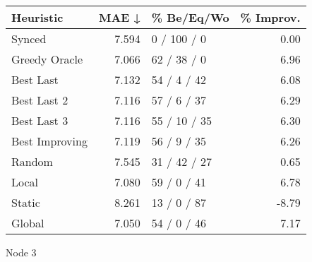 \begin{tabular}{lrlr}
\toprule
\textbf{Heuristic} & \textbf{MAE ↓} & \textbf{\% Be/Eq/Wo} & \textbf{\% Improv.} \\
\midrule
            Synced &          7.594 &          0 / 100 / 0 &                0.00 \\
     Greedy Oracle &          7.066 &          62 / 38 / 0 &                6.96 \\
         Best Last &          7.132 &          54 / 4 / 42 &                6.08 \\
       Best Last 2 &          7.116 &          57 / 6 / 37 &                6.29 \\
       Best Last 3 &          7.116 &         55 / 10 / 35 &                6.30 \\
    Best Improving &          7.119 &          56 / 9 / 35 &                6.26 \\
            Random &          7.545 &         31 / 42 / 27 &                0.65 \\
             Local &          7.080 &          59 / 0 / 41 &                6.78 \\
            Static &          8.261 &          13 / 0 / 87 &               -8.79 \\
            Global &          7.050 &          54 / 0 / 46 &                7.17 \\
\bottomrule
\end{tabular}
\caption{Node 3}
\label{tab:ds_non_lr05_le2_bs4_3}
